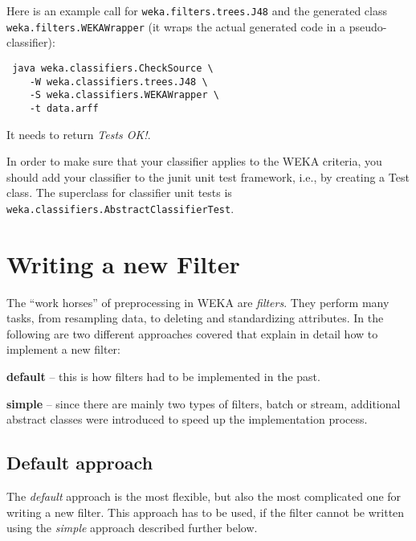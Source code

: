 Here is an example call for \texttt{weka.filters.trees.J48} and the
generated class \texttt{weka.filters.WEKAWrapper} (it wraps the actual generated
code in a pseudo-classifier):
\begin{verbatim}
 java weka.classifiers.CheckSource \
    -W weka.classifiers.trees.J48 \
    -S weka.classifiers.WEKAWrapper \
    -t data.arff
\end{verbatim}
It needs to return \textit{Tests OK!}.

In order to make sure that your classifier applies to the WEKA criteria, you
should add your classifier to the junit unit test framework, i.e., by creating a
Test class. The superclass for classifier unit tests is
\texttt{weka.classifiers.AbstractClassifierTest}.


\newpage
\section{Writing a new Filter}
The ``work horses'' of preprocessing in WEKA are \textit{filters}. They perform
many tasks, from resampling data, to deleting and standardizing attributes. In
the following are two different approaches covered that explain in detail how
to implement a new filter:
\begin{tight_itemize}
  \item \textbf{default} -- this is how filters had to be implemented in the
past.
  \item \textbf{simple }-- since there are mainly two types of filters, batch or
stream, additional abstract classes were introduced to speed up
the implementation process.
\end{tight_itemize}

\subsection{Default approach}
The \textit{default} approach is the most flexible, but also the most 
complicated one for writing a new filter. This approach has to be used, if the
filter cannot be written using the \textit{simple} approach described further
below.

